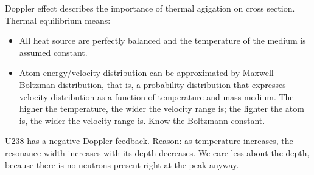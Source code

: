 \documentclass{school-22.211-notes}
\date{February 27, 2012}
\begin{document}
\maketitle


Doppler effect describes the importance of thermal agigation on cross section. Thermal equilibrium means: 
\begin{itemize}
\item All heat source are perfectly balanced and the temperature of the medium is assumed constant. 
\item Atom energy/velocity distribution can be approximated by Maxwell-Boltzman distribution, that is, a probability distribution that expresses velocity distribution as a function of temperature and mass medium. The higher the temperature, the wider the velocity range is; the lighter the atom is, the wider the velocity range is. Know the Boltzmann constant. 
\end{itemize}

U238 has a negative Doppler feedback. Reason: as temperature increases, the resonance width increases with its depth decreases. We care less about the depth, because there is no neutrons present right at the peak anyway. 
\end{document}
